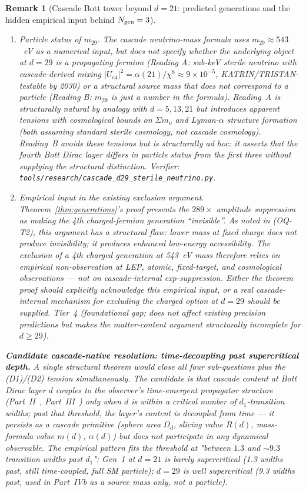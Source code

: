 \documentclass[12pt,a4paper]{article}
\newtheorem{remark}[theorem]{Remark}
\begin{document}
\begin{remark}[Cascade Bott tower beyond $d=21$: predicted generations and the hidden empirical input behind $N_{\rm gen}=3$]
\begin{enumerate}[label=(OQ-T\arabic*),nosep]
\item \emph{Particle status of $m_{29}$.} The cascade neutrino-mass formula uses $m_{29}\approx 543$~eV as a numerical input, but does not specify whether the underlying object at $d=29$ is a \emph{propagating} fermion (Reading A: sub-keV sterile neutrino with cascade-derived mixing $|U_{e4}|^2 = \alpha(21)/\chi^8 \approx 9 \times 10^{-5}$, KATRIN/TRISTAN-testable by 2030) or a \emph{structural source mass} that does not correspond to a particle (Reading B: $m_{29}$ is just a number in the formula). Reading~A is structurally natural by analogy with $d=5, 13, 21$ but introduces apparent tensions with cosmological bounds on $\Sigma m_\nu$ and Lyman-$\alpha$ structure formation (both assuming standard sterile cosmology, not cascade cosmology). Reading~B avoids these tensions but is structurally ad hoc: it asserts that the fourth Bott Dirac layer differs in particle status from the first three without supplying the structural distinction. Verifier: \texttt{tools/research/cascade\_d29\_sterile\_neutrino.py}.

\item \emph{Empirical input in the existing exclusion argument.} Theorem~\ref{thm:generations}'s proof presents the $289\times$ amplitude suppression as making the 4th charged-fermion generation ``invisible''. As noted in (OQ-T2), this argument has a structural flaw: \emph{lower} mass at fixed charge does not produce invisibility; it produces enhanced low-energy accessibility. The exclusion of a 4th charged generation at 543~eV mass therefore relies on empirical non-observation at LEP, atomic, fixed-target, and cosmological observations --- not on cascade-internal exp-suppression. \emph{Either the theorem proof should explicitly acknowledge this empirical input, or a real cascade-internal mechanism for excluding the charged option at $d=29$ should be supplied.} Tier~4 (foundational gap; does not affect existing precision predictions but makes the matter-content argument structurally incomplete for $d \geq 29$).
\end{enumerate}

\medskip\noindent\textbf{Candidate cascade-native resolution: time-decoupling past supercritical depth.}
A single structural theorem would close all four sub-questions plus the (D1)/(D2) tension simultaneously. The candidate is that cascade content at Bott Dirac layer $d$ couples to the observer's time-emergent propagator structure (Part~II~\cite{part2}, Part~III~\cite{part3}) only when $d$ is within a critical number of $d_1$-transition widths; past that threshold, the layer's content is \emph{decoupled from time} --- it persists as a cascade primitive (sphere area $\Omega_d$, slicing value $R(d)$, mass-formula value $m(d)$, $\alpha(d)$) but does not participate in any dynamical observable. The empirical pattern fits the threshold at "between $1.3$ and $\sim 9.3$ transition widths past $d_1$": Gen~1 at $d=21$ is barely supercritical (1.3 widths past, still time-coupled, full SM particle); $d=29$ is well supercritical (9.3 widths past, used in Part~IVb as a source mass only, not a particle).


\end{remark}
\end{document}
